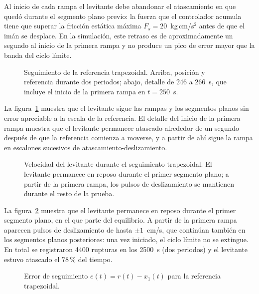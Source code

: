 Al inicio de cada rampa el levitante debe abandonar el atascamiento en que quedó durante el segmento plano previo: la fuerza que el controlador acumula tiene que superar la fricción estática máxima $F_s = 20$~kg\,cm/s$^2$ antes de que el imán se desplace. En la simulación, este retraso es de aproximadamente un segundo al inicio de la primera rampa y no produce un pico de error mayor que la banda del ciclo límite.

\begin{figure}[ht]
    \centering
    
    \caption[Seguimiento trapezoidal: posición]{Seguimiento de la referencia trapezoidal. Arriba, posición y referencia durante dos periodos; abajo, detalle de 246 a 266~s, que incluye el inicio de la primera rampa en $t=250$~s.}
    \label{fig:trap_pos}
\end{figure}

La figura~\ref{fig:trap_pos} muestra que el levitante sigue las rampas y los segmentos planos sin error apreciable a la escala de la referencia. El detalle del inicio de la primera rampa muestra que el levitante permanece atascado alrededor de un segundo después de que la referencia comienza a moverse, y a partir de ahí sigue la rampa en escalones sucesivos de atascamiento-deslizamiento.

\FloatBarrier

\begin{figure}[ht]
    \centering
    
    \caption[Seguimiento trapezoidal: velocidad]{Velocidad del levitante durante el seguimiento trapezoidal. El levitante permanece en reposo durante el primer segmento plano; a partir de la primera rampa, los pulsos de deslizamiento se mantienen durante el resto de la prueba.}
    \label{fig:trap_vel}
\end{figure}

La figura~\ref{fig:trap_vel} muestra que el levitante permanece en reposo durante el primer segmento plano, en el que parte del equilibrio. A partir de la primera rampa aparecen pulsos de deslizamiento de hasta $\pm 1$~cm/s, que continúan también en los segmentos planos posteriores: una vez iniciado, el ciclo límite no se extingue. En total se registraron 4400 rupturas en los 2500~s (dos periodos) y el levitante estuvo atascado el 78\,\% del tiempo.

\FloatBarrier

\begin{figure}[ht]
    \centering
    
    \caption[Seguimiento trapezoidal: error]{Error de seguimiento $e(t)=r(t)-x_1(t)$ para la referencia trapezoidal.}
    \label{fig:trap_error}
\end{figure}

